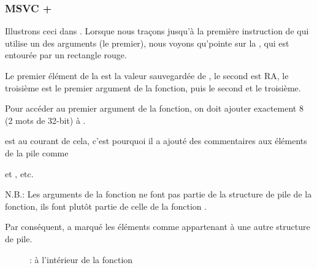 ﻿\subsubsection{MSVC + \olly}
\myindex{\olly}
Illustrons ceci dans \olly.
Lorsque nous traçons jusqu'à la première instruction de \ttf qui utilise un des
arguments (le premier), nous voyons qu'\EBP pointe sur la ,
qui est entourée par un rectangle rouge. 

Le premier élément de la  est la
valeur sauvegardée de \EBP, le second est \ac{RA}, le troisième est le premier
argument de la fonction, puis le second et le troisième.

Pour accéder au premier argument de la fonction, on doit ajouter exactement 8 (2
mots de 32-bit) à \EBP.

\olly est au courant de cela, c'est pourquoi il a ajouté des commentaires aux éléments
de la pile comme

 et , etc.

N.B.: Les arguments de la fonction ne font pas partie de la structure de pile de
la fonction, ils font plutôt partie de celle de la fonction .

Par conséquent, \olly a marqué les éléments comme appartenant à une autre structure
de pile.

\begin{figure}[H]
\centering
{}
\caption{\olly: à l'intérieur de la fonction \ttf{}}
\label{fig:passing_arguments_olly}
\end{figure}

